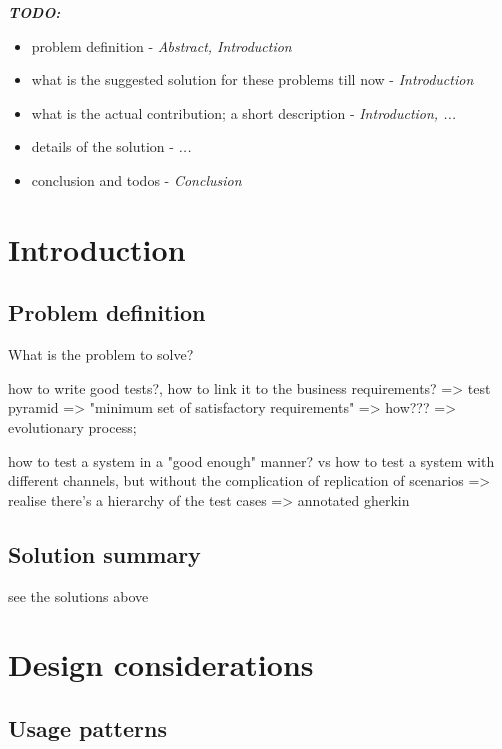 \documentclass[conference]{IEEEtran}
\begin{document}
%
\IEEEpeerreviewmaketitle

\textbf{\textit{TODO:}}
\begin{itemize}
    \item problem definition - \textit{Abstract, Introduction}
    \item what is the suggested solution for these problems till now - \textit{Introduction}
    \item what is the actual contribution; a short description - \textit{Introduction, ...}
    \item details of the solution - \textit{...}
    \item conclusion and todos - \textit{Conclusion}
\end{itemize}

\section{Introduction}
\subsection{Problem definition}
What is the problem to solve?

how to write good tests?, how to link it to the business requirements? => test pyramid => "minimum set of satisfactory requirements" => how??? => evolutionary process;

how to test a system in a "good enough" manner? vs how to test a system with different channels, but without the complication of replication of scenarios => realise there's a hierarchy of the test cases => annotated gherkin
\subsection{Solution summary}
see the solutions above

\section{Design considerations}
\subsection{Usage patterns}
\end{document}
